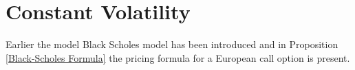 \section{Constant Volatility}
Earlier the model Black Scholes model has been introduced and in Proposition \autoref{Black-Scholes Formula} the 
pricing formula for a European call option is present. 